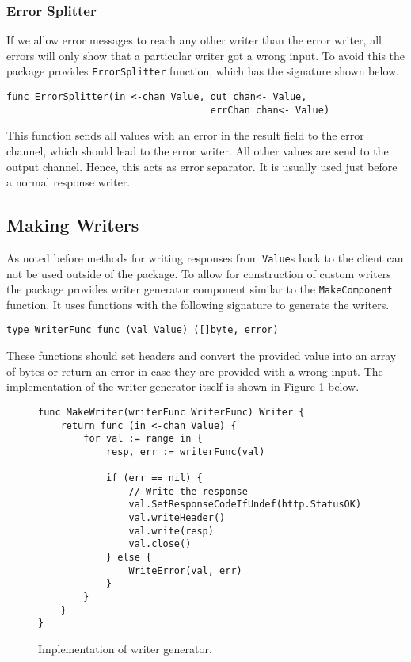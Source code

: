 \documentclass[12pt,a4paper]{article}
\begin{document}
\subsubsection{Error Splitter}
If we allow error messages to reach any other writer than the error writer,
all errors will only show that a particular writer got a wrong input.
To avoid this the package provides \texttt{ErrorSplitter} function, which
has the signature shown below.
\begin{lstlisting}
func ErrorSplitter(in <-chan Value, out chan<- Value, 
                                    errChan chan<- Value)
\end{lstlisting}
This function sends all values with an error in the result field to the 
error channel, which should lead to the error writer. All other values 
are send to the output channel. Hence, this acts as error separator.
It is usually used just before a normal response writer.

\subsection{Making Writers}
As noted before methods for writing responses from \texttt{Value}s 
back to the client can not be used outside of the package. To allow
for construction of custom writers the package provides writer generator
component similar to the \texttt{MakeComponent} function. It uses 
functions with the following signature to generate the writers.
\begin{lstlisting}
type WriterFunc func (val Value) ([]byte, error)
\end{lstlisting}
These functions should set headers and convert the provided value into 
an array of bytes or return an error in case they are provided with a 
wrong input. The implementation of the writer generator itself is shown
in Figure \ref{fig:MakeWriter} below.
\begin{figure}[h]
\centering
\begin{lstlisting}
func MakeWriter(writerFunc WriterFunc) Writer {
    return func (in <-chan Value) {
        for val := range in {
            resp, err := writerFunc(val)

            if (err == nil) {
                // Write the response
                val.SetResponseCodeIfUndef(http.StatusOK)
                val.writeHeader()
                val.write(resp)
                val.close()
            } else {
                WriteError(val, err)
            }
        }       
    }
}
\end{lstlisting}
\caption[scale=1.0]{Implementation of writer generator.}
\label{fig:MakeWriter}
\end{figure}
\end{document}
